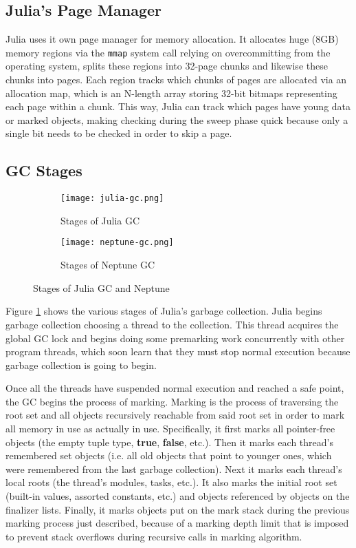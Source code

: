 \subsection{Julia's Page Manager}
Julia uses it own page manager for memory allocation.
It allocates huge (8GB) memory regions via the \texttt{mmap} system call relying on overcommitting from the operating system, splits these regions into 32-page chunks and likewise these chunks into pages.
Each region tracks which chunks of pages are allocated via an allocation map, which is an N-length array storing 32-bit bitmaps representing each page within a chunk.
This way, Julia can track which pages have young data or marked objects, making checking during the sweep phase quick because only a single bit needs to be checked in order to skip a page.

\subsection{GC Stages}
\begin{figure}[h]
  \centering
  \begin{subfigure}{0.45\textwidth}
    \texttt{[image: julia-gc.png]}
    \caption{Stages of Julia GC}
    \label{fig:stages:jl}
  \end{subfigure}
  \begin{subfigure}{0.45\textwidth}
    \texttt{[image: neptune-gc.png]}
    \caption{Stages of Neptune GC}
    \label{fig:stages:np}
  \end{subfigure}
  \caption{Stages of Julia GC and Neptune}
  \label{fig:stages}
\end{figure}

Figure \ref{fig:stages:jl} shows the various stages of Julia's garbage collection.
Julia begins garbage collection choosing a thread to the collection.
This thread acquires the global GC lock and begins doing some premarking work concurrently with other program threads, which soon learn that they must stop normal execution because garbage collection is going to begin.

Once all the threads have suspended normal execution and reached a safe point, the GC begins the process of marking.
Marking is the process of traversing the root set and all objects recursively reachable from said root set in order to mark all memory in use as actually in use.
Specifically, it first marks all pointer-free objects (the empty tuple type, \textbf{true}, \textbf{false}, etc.).
Then it marks each thread's remembered set objects (i.e. all old objects that point to younger ones, which were remembered from the last garbage collection).
Next it marks each thread's local roots (the thread's modules, tasks, etc.).
It also marks the initial root set (built-in values, assorted constants, etc.) and objects referenced by objects on the finalizer lists.
Finally, it marks objects put on the mark stack during the previous marking process just described, because of a marking depth limit that is imposed to prevent stack overflows during recursive calls in marking algorithm.

